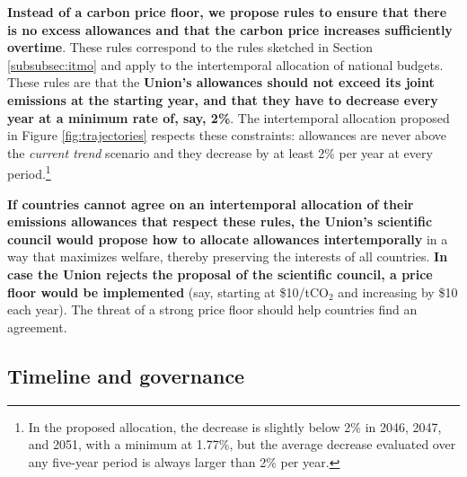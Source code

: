 \documentclass[12pt,english]{article}
\begin{document}
\textbf{Instead of a carbon price floor, we propose rules to ensure that there is no excess allowances and that the carbon price increases sufficiently overtime}. These rules correspond to the rules sketched in Section \ref{subsubsec:itmo} and apply to the intertemporal allocation of national budgets. These rules are that the \textbf{Union's allowances should not exceed its joint emissions at the starting year, and that they have to decrease every year at a minimum rate of, say, 2\%}. The intertemporal allocation proposed in Figure \ref{fig:trajectories} respects these constraints: allowances are never above the \textit{current trend} scenario and they decrease by at least 2\% per year at every period.\footnote{In the proposed allocation, the decrease is slightly below 2\% in 2046, 2047, and 2051, with a minimum at 1.77\%, but the average decrease evaluated over any five-year period is always larger than 2\% per year.}

\textbf{If countries cannot agree on an intertemporal allocation of their emissions allowances that respect these rules, the Union's scientific council would propose how to allocate allowances intertemporally} in a way that maximizes welfare, thereby preserving the interests of all countries. \textbf{In case the Union rejects the proposal of the scientific council, a price floor would be implemented} (say, starting at \$10/tCO$_\text{2}$ and increasing by \$10 each year). The threat of a strong price floor should help countries find an agreement.

\subsection{Timeline and governance\label{subsec:implementation}}

\end{document}
